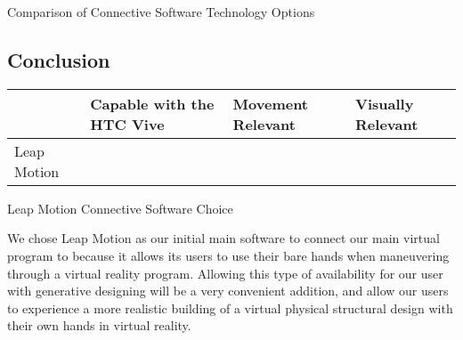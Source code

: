 \documentclass[letterpaper,10pt,onecolumn,compsoc]{IEEEtran}
\begin{document}
\begin{center}
Comparison of Connective Software Technology Options
\end{center}

\newpage

\subsection{Conclusion}

\begin{center}
\begin{tabular}{ | P{3.5cm} | P{3cm} | P{2.5cm} | P{2.5cm} | } 
 	\hline
 	 & Capable with the HTC Vive & Movement Relevant & Visually Relevant \\ 
 	\hline 		
 	Leap Motion & \checkmark & \checkmark & \\ 
 	\hline
\end{tabular}
\end{center}

\begin{center}
Leap Motion Connective Software Choice
\end{center}

\noindent
We chose Leap Motion as our initial main software to connect our main virtual program to because it allows its users to use their bare hands when maneuvering through a virtual reality program. Allowing this type of availability for our user with generative designing will be a very convenient addition, and allow our users to experience a more realistic building of a virtual physical structural design with their own hands in virtual reality.

\newpage

\end{document}
